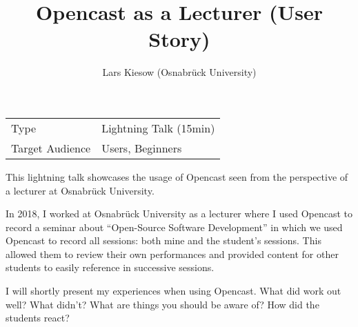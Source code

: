 \documentclass[a4paper]{article}
\title{Opencast as a Lecturer (User Story)}
\author{Lars Kiesow (Osnabrück University)}
\begin{document}
\maketitle

\begin{center}
\begin{tabular}{ll}
\toprule
	Type            & Lightning Talk (15min) \\
	Target Audience & Users, Beginners \\
\bottomrule
\end{tabular}
\end{center}

\vspace{1em}

This lightning talk showcases the usage of Opencast seen from the perspective
of a lecturer at Osnabrück University.

In 2018, I worked at Osnabrück University as a lecturer where I used Opencast
to record a seminar about “Open-Source Software Development” in which we used
Opencast to record all sessions: both mine and the student's sessions. This
allowed them to review their own performances and provided content for other
students to easily reference in successive sessions.

I will shortly present my experiences when using Opencast. What did work out
well? What didn't? What are things you should be aware of? How did the students
react?
\end{document}
